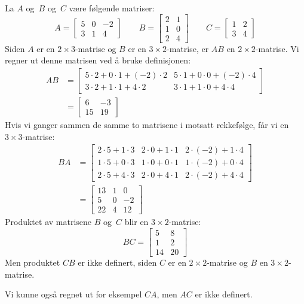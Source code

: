\begin{ex}
La $A$ og~$B$ og~$C$ være følgende matriser:
\[
A =
\begin{bmatrix}
5 & 0 & -2 \\
3 & 1 &  4
\end{bmatrix}
\qquad
B =
\begin{bmatrix}
2 & 1 \\
1 & 0 \\
2 & 4
\end{bmatrix}
\qquad
C =
\begin{bmatrix}
1 & 2 \\
3 & 4
\end{bmatrix}
\]
Siden $A$ er en $2 \times 3$-matrise og $B$ er en
$3 \times 2$-matrise, er $AB$ en $2 \times 2$-matrise.  Vi regner ut
denne matrisen ved å bruke definisjonen:
\begin{align*}
AB
&=
\begin{bmatrix}
5 \cdot 2 + 0 \cdot 1 + (-2) \cdot 2 &
5 \cdot 1 + 0 \cdot 0 + (-2) \cdot 4 \\
3 \cdot 2 + 1 \cdot 1 +    4 \cdot 2 &
3 \cdot 1 + 1 \cdot 0 +    4 \cdot 4
\end{bmatrix}
\\
&=
\begin{bmatrix}
 6 & -3 \\
15 & 19
\end{bmatrix}
\end{align*}
Hvis vi ganger sammen de samme to matrisene i motsatt rekkefølge, får
vi en $3 \times 3$-matrise:
\begin{align*}
BA
&=
\begin{bmatrix}
2 \cdot 5 + 1 \cdot 3 &
2 \cdot 0 + 1 \cdot 1 &
2 \cdot (-2) + 1 \cdot 4 \\
1 \cdot 5 + 0 \cdot 3 &
1 \cdot 0 + 0 \cdot 1 &
1 \cdot (-2) + 0 \cdot 4 \\
2 \cdot 5 + 4 \cdot 3 &
2 \cdot 0 + 4 \cdot 1 &
2 \cdot (-2) + 4 \cdot 4
\end{bmatrix}
\\
&=
\begin{bmatrix}
13 &  1 &  0 \\
 5 &  0 & -2 \\
22 &  4 & 12
\end{bmatrix}
\end{align*}
Produktet av matrisene $B$ og~$C$ blir en $3 \times 2$-matrise:
\[
BC =
\begin{bmatrix}
 5 &  8 \\
 1 &  2 \\
14 & 20
\end{bmatrix}
\]
Men produktet $CB$ er ikke definert, siden $C$ er en
$2 \times 2$-matrise og $B$ en $3 \times 2$-matrise.

Vi kunne også regnet ut for eksempel $CA$, men $AC$ er ikke definert.
\end{ex}

